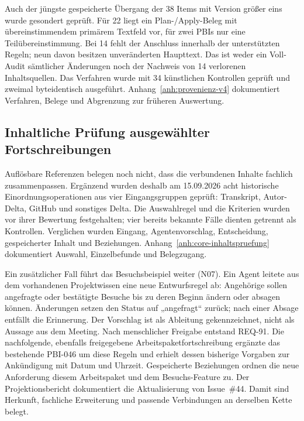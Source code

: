Auch der jüngste gespeicherte Übergang der 38 Items mit Version
größer eins wurde gesondert geprüft. Für 22 liegt ein Plan-/Apply-Beleg
mit übereinstimmendem primärem Textfeld vor, für zwei PBIs nur eine
Teilübereinstimmung. Bei 14 fehlt der Anschluss innerhalb der
unterstützten Regeln; neun davon besitzen unveränderten Haupttext.
Das ist weder ein Voll-Audit sämtlicher Änderungen noch der Nachweis
von 14 verlorenen Inhaltsquellen. Das Verfahren wurde mit 34
künstlichen Kontrollen geprüft und zweimal byteidentisch ausgeführt.
Anhang~\ref{anh:provenienz-v4} dokumentiert Verfahren, Belege und
Abgrenzung zur früheren Auswertung.

\subsection{Inhaltliche Prüfung ausgewählter Fortschreibungen}
\label{sec:eval-core-inhalte}

Auflösbare Referenzen belegen noch nicht, dass die verbundenen
Inhalte fachlich zusammenpassen. Ergänzend wurden deshalb am
15.09.2026 acht historische Einordnungsoperationen aus vier
Eingangsgruppen geprüft: Transkript, Autor-Delta, GitHub und sonstiges
Delta. Die Auswahlregel und die Kriterien wurden
vor ihrer Bewertung festgehalten; vier bereits bekannte Fälle
dienten getrennt als Kontrollen. Verglichen wurden Eingang,
Agentenvorschlag, Entscheidung, gespeicherter Inhalt und Beziehungen.
Anhang~\ref{anh:core-inhaltspruefung} dokumentiert Auswahl,
Einzelbefunde und Belegzugang.

Ein zusätzlicher Fall führt das Besuchsbeispiel weiter (N07).
Ein Agent leitete aus dem vorhandenen Projektwissen eine neue
Entwurfsregel ab: Angehörige sollen angefragte oder bestätigte
Besuche bis zu deren Beginn ändern oder absagen können. Änderungen
setzen den Status auf „angefragt`` zurück; nach einer Absage entfällt
die Erinnerung. Der Vorschlag ist als Ableitung gekennzeichnet,
nicht als Aussage aus dem Meeting. Nach menschlicher Freigabe
entstand REQ-91. Die nachfolgende, ebenfalls freigegebene
Arbeitspaketfortschreibung ergänzte das bestehende PBI-046 um diese
Regeln und erhielt dessen bisherige Vorgaben zur Ankündigung mit
Datum und Uhrzeit. Gespeicherte Beziehungen ordnen die neue
Anforderung diesem Arbeitspaket und dem Besuchs-Feature zu.
Der Projektionsbericht dokumentiert die Aktualisierung von
Issue~\#44. Damit sind Herkunft, fachliche Erweiterung und passende
Verbindungen an derselben Kette belegt.

